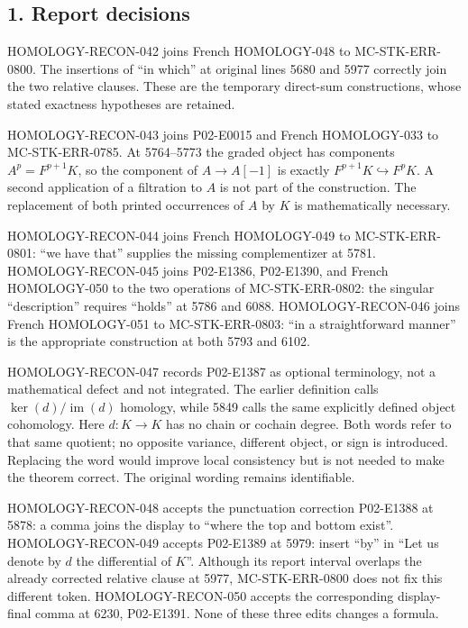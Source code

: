 \documentclass[11pt]{article}
\begin{document}
\subsection{1. Report decisions}\label{note-06-report-decisions}

HOMOLOGY-RECON-042 joins French HOMOLOGY-048 to MC-STK-ERR-0800. The insertions of ``in which'' at original lines 5680 and 5977 correctly join the two relative clauses. These are the temporary direct-sum constructions, whose stated exactness hypotheses are retained.

HOMOLOGY-RECON-043 joins P02-E0015 and French HOMOLOGY-033 to MC-STK-ERR-0785. At 5764--5773 the graded object has components \(A^p=F^{p+1}K\), so the component of \(A\to A[-1]\) is exactly \(F^{p+1}K\hookrightarrow F^pK\). A second application of a filtration to \(A\) is not part of the construction. The replacement of both printed occurrences of \(A\) by \(K\) is mathematically necessary.

HOMOLOGY-RECON-044 joins French HOMOLOGY-049 to MC-STK-ERR-0801: ``we have that'' supplies the missing complementizer at 5781. HOMOLOGY-RECON-045 joins P02-E1386, P02-E1390, and French HOMOLOGY-050 to the two operations of MC-STK-ERR-0802: the singular ``description'' requires ``holds'' at 5786 and 6088. HOMOLOGY-RECON-046 joins French HOMOLOGY-051 to MC-STK-ERR-0803: ``in a straightforward manner'' is the appropriate construction at both 5793 and 6102.

HOMOLOGY-RECON-047 records P02-E1387 as optional terminology, not a mathematical defect and not integrated. The earlier definition calls \(\ker(d)/\operatorname{im}(d)\) homology, while 5849 calls the same explicitly defined object cohomology. Here \(d:K\to K\) has no chain or cochain degree. Both words refer to that same quotient; no opposite variance, different object, or sign is introduced. Replacing the word would improve local consistency but is not needed to make the theorem correct. The original wording remains identifiable.

HOMOLOGY-RECON-048 accepts the punctuation correction P02-E1388 at 5878: a comma joins the display to ``where the top and bottom exist''. HOMOLOGY-RECON-049 accepts P02-E1389 at 5979: insert ``by'' in ``Let us denote by \(d\) the differential of \(K\)''. Although its report interval overlaps the already corrected relative clause at 5977, MC-STK-ERR-0800 does not fix this different token. HOMOLOGY-RECON-050 accepts the corresponding display-final comma at 6230, P02-E1391. None of these three edits changes a formula.
\end{document}
